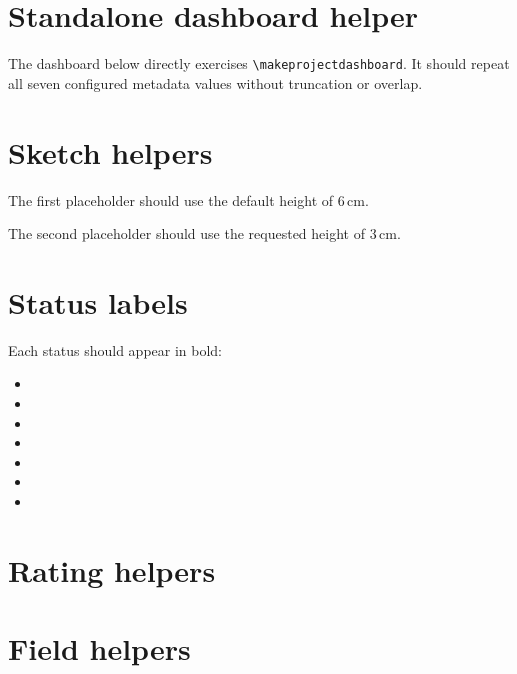 \documentclass{otengineering}
\begin{document}
\makeotengtitle

\section{Standalone dashboard helper}

The dashboard below directly exercises \verb|\makeprojectdashboard|. It should
repeat all seven configured metadata values without truncation or overlap.

\makeprojectdashboard

\section{Sketch helpers}

The first placeholder should use the default height of \(6\,\mathrm{cm}\).


The second placeholder should use the requested height of \(3\,\mathrm{cm}\).


\section{Status labels}

Each status should appear in bold:

\begin{itemize}
    \item \statusseed
    \item \statusconcept
    \item \statusdesign
    \item \statusprototype
    \item \statustesting
    \item \statusdeployment
    \item \statusarchived
\end{itemize}

\section{Rating helpers}


\section{Field helpers}
\end{document}
